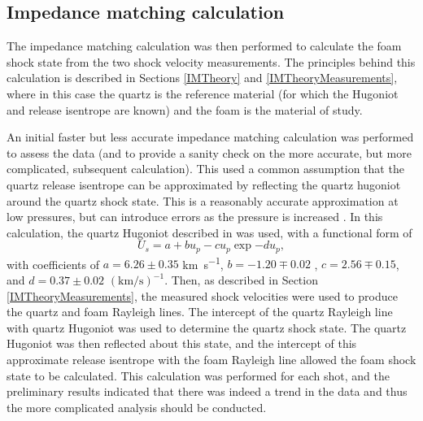 \subsection{Impedance matching calculation} \label{IM calc}
The impedance matching calculation was then performed to calculate the foam shock state from the two shock velocity measurements. The principles behind this calculation is described in Sections \ref{IMTheory} and \ref{IMTheoryMeasurements}, where in this case the quartz is the reference material (for which the Hugoniot and release isentrope are known) and the foam is the material of study.

An initial faster but less accurate impedance matching calculation was performed to assess the data (and to provide a sanity check on the more accurate, but more complicated, subsequent calculation). This used a common assumption that the quartz release isentrope can be approximated by reflecting the quartz hugoniot around the quartz shock state. This is a reasonably accurate approximation at low pressures, but can introduce errors as the pressure is increased \cite{Forbes2012}. In this calculation, the quartz Hugoniot described in \cite{Knudson2009} was used, with a functional form of 
\begin{equation} \label{eqn:Old Hugoniot} U_s = a + b u_p - c u_p \exp{-d u_p}, \end{equation}
with coefficients of $a = 6.26 \pm 0.35$ \unit{\kilo\meter\per\second}, $b = -1.20 \mp 0.02$ , $c = 2.56 \mp 0.15$, and $d = 0.37 \pm 0.02$ $(\unit{\kilo\meter\per\second})^{-1}$. Then, as described in Section \ref{IMTheoryMeasurements}, the measured shock velocities were used to produce the quartz and foam Rayleigh lines. The intercept of the quartz Rayleigh line with quartz Hugoniot was used to determine the quartz shock state. The quartz Hugoniot was then reflected about this state, and the intercept of this approximate release isentrope with the foam Rayleigh line allowed the foam shock state to be calculated. This calculation was performed for each shot, and the preliminary results indicated that there was indeed a trend in the data and thus the more complicated analysis should be conducted.

